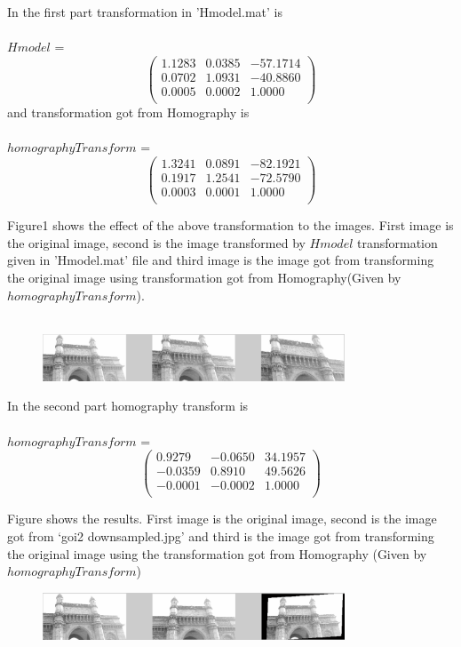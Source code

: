 \documentclass[a4paper,10pt]{article}
\begin{document}
\section{}

In the first part transformation in 'Hmodel.mat' is \\
\\
$Hmodel$ = \[ \left( \begin{array}{cccc}
    1.1283 &  0.0385 & -57.1714\\
    0.0702 &  1.0931 & -40.8860\\
    0.0005 &  0.0002 &  1.0000\\
              \end{array} \right)\]
and transformation got from Homography is\\
\\

$homographyTransform$ = \[ \left( \begin{array}{cccc}
    1.3241 &  0.0891 & -82.1921\\
    0.1917 &  1.2541 & -72.5790\\
    0.0003 &  0.0001 &  1.0000\\
              \end{array} \right)\]
            
            
Figure1 shows the effect of the above transformation to the images. First image is the original image,
second is the image transformed by $Hmodel$ transformation given in 'Hmodel.mat' file and third image is the image 
got from transforming the original image using transformation got from Homography(Given by $homographyTransform$).
\\
\\
\begin{figure}[ht!]
\centering
\includegraphics[width=90mm]{figure1.png}
\caption{}
\end{figure}

In the second part homography transform is \\
\\
    $homographyTransform$ = \[ \left( \begin{array}{cccc}
    0.9279 & -0.0650 & 34.1957\\
   -0.0359 &  0.8910 & 49.5626\\
   -0.0001 & -0.0002 &  1.0000\\
             \end{array} \right)\]       

Figure shows the results. First image is the original image, second is the image got from ‘goi2 downsampled.jpg’
and third is the image got from transforming the original image using the transformation got from Homography (Given by $homographyTransform$)
\begin{figure}[ht!]
\centering
\includegraphics[width=90mm]{figure2.png}
\caption{}
\end{figure}
\end{document}
